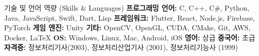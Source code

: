 \begin{rubric}{기술 및 언어 역량 (Skills \& Languages)}
     \textbf{프로그래밍 언어: } C, C++, C\#, Python, Java, JavaScript, Swift, Dart, Lisp
     \textbf{프레임워크:} Flutter, React, Node.js, Firebase, PyTorch
     \textbf{게임 엔진:} Unity
     \textbf{기타:} OpenCV, OpenGL, CUDA, CMake, Git, AWS, Docker, \LaTeX
     \textbf{OS:} Windows, Linux, Mac, Android, iOS
    \entry*[Languages] \textbf{영어: } 상급
    \entry*[Languages] \textbf{중국어: } 초급
    \entry*[Qulifications] \textbf{자격증: } 정보처리기사(2003), 정보처리산업기사 (2001), 정보처리기능사 (1999)
\end{rubric}